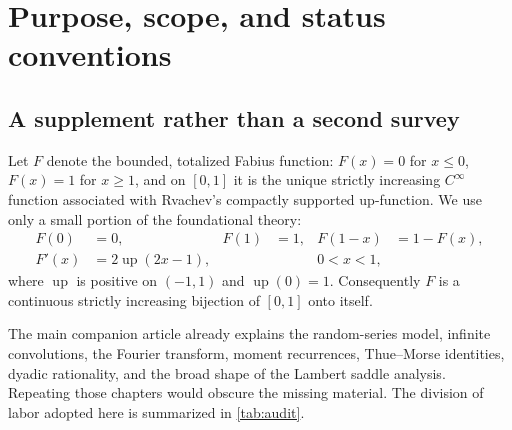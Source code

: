 \documentclass[11pt,oneside]{article}
\theoremstyle{definition}
\theoremstyle{remark}
\newcommand{\Up}{\operatorname{up}}
\begin{document}
\tableofcontents
\clearpage

\section{Purpose, scope, and status conventions}

\subsection{A supplement rather than a second survey}

Let $F$ denote the bounded, totalized Fabius function: $F(x)=0$ for
$x\leq0$, $F(x)=1$ for $x\geq1$, and on $[0,1]$ it is the unique strictly
increasing $C^\infty$ function associated with Rvachev's compactly
supported up-function.  We use only a small portion of the foundational
theory:
\begin{align}
 F(0)&=0,&F(1)&=1,&F(1-x)&=1-F(x), \label{eq:F-basic}\\
 F'(x)&=2\Up(2x-1),&&&0<x<1, \label{eq:Fprime-up}
\end{align}
where $\Up$ is positive on $(-1,1)$ and $\Up(0)=1$.  Consequently $F$ is a
continuous strictly increasing bijection of $[0,1]$ onto itself.

The main companion article already explains the random-series model,
infinite convolutions, the Fourier transform, moment recurrences,
Thue--Morse identities, dyadic rationality, and the broad shape of the
Lambert saddle analysis.  Repeating those chapters would obscure the
missing material.  The division of labor adopted here is summarized in
\cref{tab:audit}.
\end{document}
